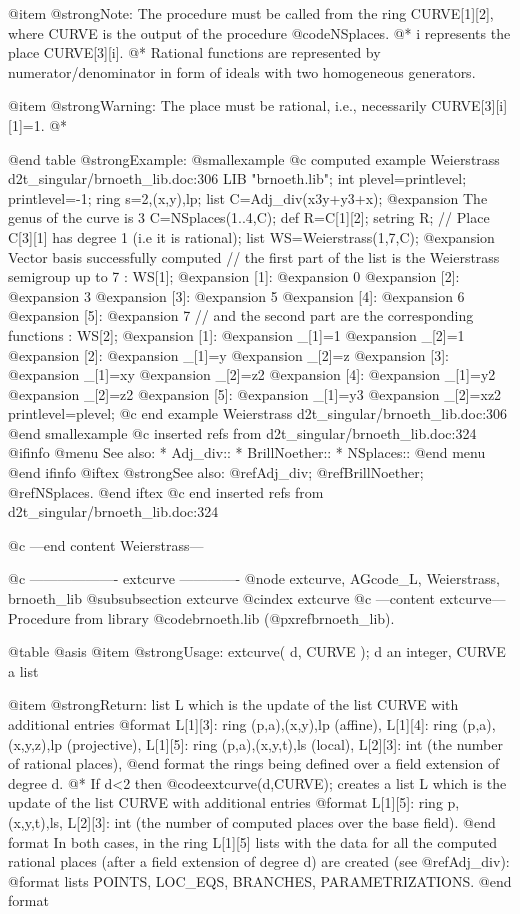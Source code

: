 @item @strong{Note:}
The procedure must be called from the ring CURVE[1][2],
where CURVE is the output of the procedure @code{NSplaces}.
@* i represents the place CURVE[3][i].
@* Rational functions are represented by numerator/denominator
in form of ideals with two homogeneous generators.

@item @strong{Warning:}
The place must be rational, i.e., necessarily CURVE[3][i][1]=1. @*

@end table
@strong{Example:}
@smallexample
@c computed example Weierstrass d2t_singular/brnoeth_lib.doc:306 
LIB "brnoeth.lib";
int plevel=printlevel;
printlevel=-1;
ring s=2,(x,y),lp;
list C=Adj_div(x3y+y3+x);
@expansion{} The genus of the curve is 3
C=NSplaces(1..4,C);
def R=C[1][2];
setring R;
// Place C[3][1] has degree 1 (i.e it is rational);
list WS=Weierstrass(1,7,C);
@expansion{} Vector basis successfully computed 
// the first part of the list is the Weierstrass semigroup up to 7 :
WS[1];
@expansion{} [1]:
@expansion{}    0
@expansion{} [2]:
@expansion{}    3
@expansion{} [3]:
@expansion{}    5
@expansion{} [4]:
@expansion{}    6
@expansion{} [5]:
@expansion{}    7
// and the second part are the corresponding functions :
WS[2];
@expansion{} [1]:
@expansion{}    _[1]=1
@expansion{}    _[2]=1
@expansion{} [2]:
@expansion{}    _[1]=y
@expansion{}    _[2]=z
@expansion{} [3]:
@expansion{}    _[1]=xy
@expansion{}    _[2]=z2
@expansion{} [4]:
@expansion{}    _[1]=y2
@expansion{}    _[2]=z2
@expansion{} [5]:
@expansion{}    _[1]=y3
@expansion{}    _[2]=xz2
printlevel=plevel;
@c end example Weierstrass d2t_singular/brnoeth_lib.doc:306
@end smallexample
@c inserted refs from d2t_singular/brnoeth_lib.doc:324
@ifinfo
@menu
See also:
* Adj_div::
* BrillNoether::
* NSplaces::
@end menu
@end ifinfo
@iftex
@strong{See also:}
@ref{Adj_div};
@ref{BrillNoether};
@ref{NSplaces}.
@end iftex
@c end inserted refs from d2t_singular/brnoeth_lib.doc:324

@c ---end content Weierstrass---

@c ------------------- extcurve -------------
@node extcurve, AGcode_L, Weierstrass, brnoeth_lib
@subsubsection extcurve
@cindex extcurve
@c ---content extcurve---
Procedure from library @code{brnoeth.lib} (@pxref{brnoeth_lib}).

@table @asis
@item @strong{Usage:}
extcurve( d, CURVE ); d an integer, CURVE a list

@item @strong{Return:}
list L which is the update of the list CURVE with additional entries
   @format
   L[1][3]: ring (p,a),(x,y),lp (affine),
   L[1][4]: ring (p,a),(x,y,z),lp (projective),
   L[1][5]: ring (p,a),(x,y,t),ls (local),
   L[2][3]: int  (the number of rational places),
   @end format
the rings being defined over a field extension of degree d. @*
If d<2 then @code{extcurve(d,CURVE);} creates a list L which
is the update of the list CURVE with additional entries
   @format
   L[1][5]: ring p,(x,y,t),ls,
   L[2][3]: int  (the number of computed places over the base field).
   @end format
In both cases, in the ring L[1][5] lists with the data for all the
computed rational places (after a field extension of degree d) are
created (see @ref{Adj_div}):
   @format
   lists POINTS, LOC_EQS, BRANCHES, PARAMETRIZATIONS.
   @end format

